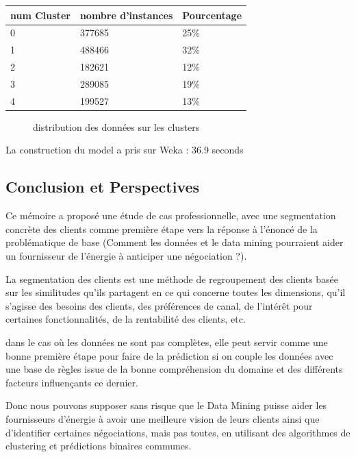 \documentclass[12pt]{article}
\begin{document}
{\begin{center}
\begin{tabular}{|p{3cm}|p{3cm}|p{3cm}|}
num Cluster & nombre d’instances & Pourcentage \\
  \hline
  
0& 377685 & 25\% \\
  \hline
1 & 488466 & 32\% \\
  \hline

2 & 182621 & 12\%\\
 
 
3 &289085 & 19\%\\
 \hline
4 &199527 &13\%\\
  \hline
\end{tabular}
\end{center}
\begin{figure}[H]
	\centering
    
     \caption{ distribution des données sur les clusters}
    \label{fig:40}
\end{figure}

La construction du model a pris sur Weka : 36.9 seconds


\subsection{Conclusion et Perspectives}
Ce mémoire a proposé une étude de cas professionnelle, avec une segmentation concrète des clients comme première étape vers la réponse à l'énoncé de la problématique de base (Comment les données et le data mining pourraient aider un fournisseur de l’énergie à anticiper une négociation ?).

La segmentation des clients est une méthode de regroupement des clients basée sur les similitudes qu'ils partagent en ce qui concerne toutes les dimensions, qu'il s'agisse des besoins des clients, des préférences de canal, de l'intérêt pour certaines fonctionnalités, de la rentabilité des clients, etc. 

dans le cas où les données ne sont pas complètes, elle peut servir comme une bonne première  étape pour faire de la prédiction si on couple les données avec une base de règles issue de la bonne compréhension du domaine et des différents facteurs influençants ce dernier.

Donc nous pouvons supposer sans risque que le Data Mining puisse aider les fournisseurs d’énergie à avoir une meilleure vision de leurs clients ainsi que d’identifier certaines négociations, mais pas toutes, en utilisant des algorithmes de clustering et prédictions binaires communes. 

}
\end{document}
